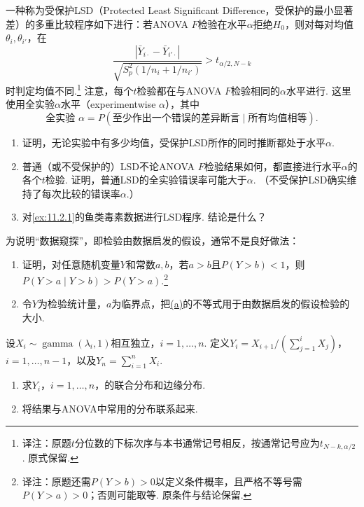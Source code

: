 \begin{exercise}\label{exercise:11.17}
一种称为受保护LSD（Protected Least Significant Difference，受保护的最小显著差）的多重比较程序如下进行：若ANOVA $F$检验在水平$\alpha$拒绝$H_0$，则对每对均值$\theta_i,\theta_{i'}$，在
$$\frac{|\bar Y_{i\cdot}-\bar Y_{i'\cdot}|}{\sqrt{S_p^2(1/n_i+1/n_{i'})}}>t_{\alpha/2,N-k}$$
时判定均值不同.\footnote{译注：原题$t$分位数的下标次序与本书通常记号相反，按通常记号应为$t_{N-k,\alpha/2}$. 原式保留.} 注意，每个$t$检验都在与ANOVA $F$检验相同的$\alpha$水平进行. 这里使用全实验$\alpha$水平（experimentwise $\alpha$），其中
$$\text{全实验 }\alpha=P\left(\text{至少作出一个错误的差异断言}\mid\text{所有均值相等}\right).$$
\begin{enumerate}[label=(\alph*)]
\item\label{item:11.17.a} 证明，无论实验中有多少均值，受保护LSD所作的同时推断都处于水平$\alpha$.
\item\label{item:11.17.b} 普通（或不受保护的）LSD不论ANOVA $F$检验结果如何，都直接进行水平$\alpha$的各个$t$检验. 证明，普通LSD的全实验错误率可能大于$\alpha$. （不受保护LSD确实维持了每次比较的错误率$\alpha$.）
\item\label{item:11.17.c} 对\autoref{ex:11.2.1}的鱼类毒素数据进行LSD程序. 结论是什么？
\end{enumerate}
\end{exercise}

\begin{exercise}\label{exercise:11.18}
为说明“数据窥探”，即检验由数据启发的假设，通常不是良好做法：
\begin{enumerate}[label=(\alph*)]
\item\label{item:11.18.a} 证明，对任意随机变量$Y$和常数$a,b$，若$a>b$且$P(Y>b)<1$，则$P(Y>a\mid Y>b)>P(Y>a)$.\footnote{译注：原题还需$P(Y>b)>0$以定义条件概率，且严格不等号需$P(Y>a)>0$；否则可能取等. 原条件与结论保留.}
\item\label{item:11.18.b} 令$Y$为检验统计量，$a$为临界点，把\hyperref[item:11.18.a]{(a)}的不等式用于由数据启发的假设检验的大小.
\end{enumerate}
\end{exercise}

\begin{exercise}\label{exercise:11.19}
设$X_i\sim\operatorname{gamma}(\lambda_i,1)$相互独立，$i=1,\ldots,n$. 定义$Y_i=X_{i+1}/(\sum_{j=1}^iX_j)$，$i=1,\ldots,n-1$，以及$Y_n=\sum_{i=1}^nX_i$.
\begin{enumerate}[label=(\alph*)]
\item\label{item:11.19.a} 求$Y_i$，$i=1,\ldots,n$，的联合分布和边缘分布.
\item\label{item:11.19.b} 将结果与ANOVA中常用的分布联系起来.
\end{enumerate}
\end{exercise}

